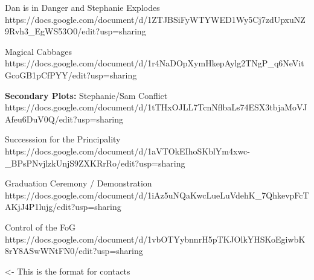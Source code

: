 \documentclass[char]{GL2020}
\begin{document}
Dan is in Danger and Stephanie Explodes
https://docs.google.com/document/d/1ZTJBSiFyWTYWED1Wy5Cj7zdUpxuNZ9Rvh3_EgWS53O0/edit?usp=sharing

Magical Cabbages
https://docs.google.com/document/d/1r4NaDOpXymHkepAylg2TNgP_q6NeVitGcoGB1pCfPYY/edit?usp=sharing


\textbf{Secondary Plots:}
Stephanie/Sam Conflict
https://docs.google.com/document/d/1tTHxOJLL7TcnNflbaLs74ESX3tbjaMoVJAfeu6DuV0Q/edit?usp=sharing

Successsion for the Principality
https://docs.google.com/document/d/1aVTOkEIhoSKblYm4xwc-_BPsPNvjlzkUnjS9ZXKRrRo/edit?usp=sharing

Graduation Ceremony / Demonstration
https://docs.google.com/document/d/1iAz5uNQaKwcLueLuVdehK_7QhkevpFcTAKjJ4P1lujg/edit?usp=sharing

Control of the FoG
https://docs.google.com/document/d/1vbOTYybnnrH5pTKJOlkYHSKoEgiwbK8rY8ASwWNtFN0/edit?usp=sharing

\begin{itemz}[Goals]
	\item 
\end{itemz}

\begin{itemz}[Notes]
	\item 
\end{itemz}

\begin{contacts}
	\contact{\cTest{}} <- This is the format for contacts 
\end{contacts}
\end{document}
